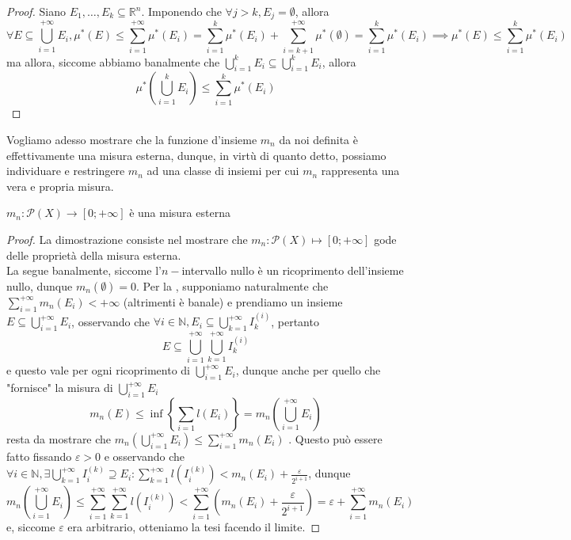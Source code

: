 \begin{proof}
	Siano $E_1, \ldots, E_k \subseteq \mathbb{R}^n$. Imponendo che $\forall j > k, E_j = \emptyset$, allora
	$$
	\forall E \subseteq \bigcup_{i=1}^{+\infty} E_i, \mu^*(E) \leq \sum_{i=1}^{+\infty} \mu^*(E_i) = \sum\limits_{i=1}^{k} \mu^*(E_i) + \sum\limits_{i=k+1}^{+\infty} \mu^*(\emptyset) = \sum\limits_{i=1}^k \mu^*(E_i) \implies \mu^*(E) \leq \sum_{i=1}^k \mu^*(E_i)
	$$
	ma allora, siccome abbiamo banalmente che $\bigcup\limits_{i=1}^{k} E_i \subseteq \bigcup\limits_{i=1}^k E_i$, allora
	$$
	\mu^* \left( \bigcup_{i=1}^k E_i \right) \leq \sum_{i=1}^k \mu^*(E_i)
	$$
\end{proof}
Vogliamo adesso mostrare che la funzione d'insieme $m_n$ da noi definita è effettivamente una misura esterna, dunque, in virtù di quanto detto, possiamo individuare e restringere $m_n$ ad una classe di insiemi per cui $m_n$ rappresenta una vera e propria misura.
\begin{prop}
	$m_n: \mathcal{P}(X) \to [0; +\infty]$ è una misura esterna
	\label{prop:lebesgue_mis_esterna}
\end{prop}
\begin{proof}
	La dimostrazione consiste nel mostrare che $m_n: \mathcal{P}(X) \mapsto [0; +\infty]$ gode delle proprietà della misura esterna. \\
	La  segue banalmente, siccome l'$n-$intervallo nullo è un ricoprimento dell'insieme nullo, dunque $m_n(\emptyset) = 0$.
	Per la , supponiamo naturalmente che $\sum\limits_{i=1}^{+\infty} m_n(E_i) < +\infty$ (altrimenti è banale) e prendiamo un insieme $E \subseteq \bigcup\limits_{i=1}^{+\infty} E_i$, osservando che $\forall i \in \mathbb{N}, E_i \subseteq \bigcup\limits_{k=1}^{+\infty} I_{k}^{(i)}$, pertanto
	$$
		E \subseteq \bigcup_{i=1}^{+\infty} \bigcup_{k=1}^{+\infty} I_k^{(i)}
	$$
	e questo vale per ogni ricoprimento di $\bigcup\limits_{i=1}^{+\infty} E_i$, dunque anche per quello che "fornisce" la misura di $\bigcup\limits_{i=1}^{+\infty} E_i$
	$$
		m_n(E) \leq \inf \left\{\sum_{i=1} l(E_i) \right\} = m_n \left( \bigcup_{i=1}^{+\infty} E_i \right)
	$$
	resta da mostrare che $m_n( \bigcup\limits_{i=1}^{+\infty} E_i ) \leq \sum\limits_{i=1}^{+\infty} m_n(E_i)$ . Questo può essere fatto fissando $\varepsilon > 0$ e osservando che $\forall i \in \mathbb{N}, \exists \bigcup\limits_{k=1}^{+\infty} I_{i}^{(k)} \supseteq E_i : \sum\limits_{k=1}^{+\infty} l(I_i^{(k)}) < m_n(E_i) + \frac{\varepsilon}{2^{i+1}}$, dunque
	$$
	m_n \left( \bigcup_{i=1}^{+\infty} E_i \right) \leq \sum_{i=1}^{+\infty} \sum_{k=1}^{+\infty} l(I_{i}^{(k)}) < \sum_{i=1}^{+\infty} (m_n(E_i) + \frac{\varepsilon}{2^{i+1}}) = \varepsilon + \sum_{i=1}^{+\infty} m_n(E_i)
	$$
	e, siccome $\varepsilon$ era arbitrario, otteniamo la tesi facendo il limite.
\end{proof}

